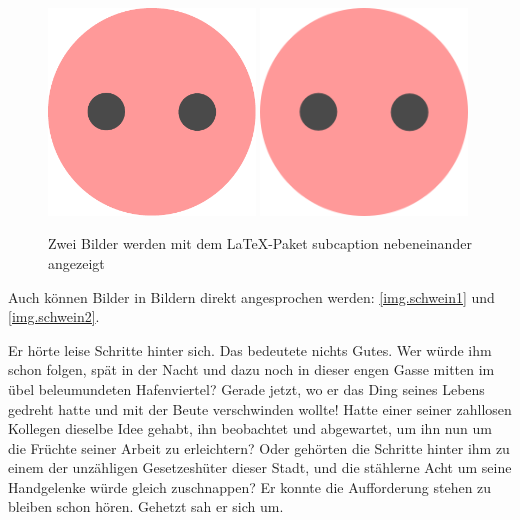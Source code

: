 \begin{figure}
\centering
{} {\includegraphics[width=0.49\textwidth]{images/schwein1}}
{\includegraphics[width=0.49\textwidth]{images/schwein2}}
\caption{Zwei Bilder werden mit dem \LaTeX-Paket subcaption nebeneinander angezeigt}\label{img.subcaption}
\end{figure}

Auch können Bilder in Bildern direkt angesprochen werden: \autoref{img.schwein1} und  \autoref{img.schwein2}.


Er hörte leise Schritte hinter sich. Das bedeutete nichts Gutes. Wer würde ihm schon folgen, spät in der Nacht und dazu noch in dieser engen Gasse mitten im übel beleumundeten Hafenviertel? Gerade jetzt, wo er das Ding seines Lebens gedreht hatte und mit der Beute verschwinden wollte! Hatte einer seiner zahllosen Kollegen dieselbe Idee gehabt, ihn beobachtet und abgewartet, um ihn nun um die Früchte seiner Arbeit zu erleichtern? Oder gehörten die Schritte hinter ihm zu einem der unzähligen Gesetzeshüter dieser Stadt, und die stählerne Acht um seine Handgelenke würde gleich zuschnappen? Er konnte die Aufforderung stehen zu bleiben schon hören. Gehetzt sah er sich um.

